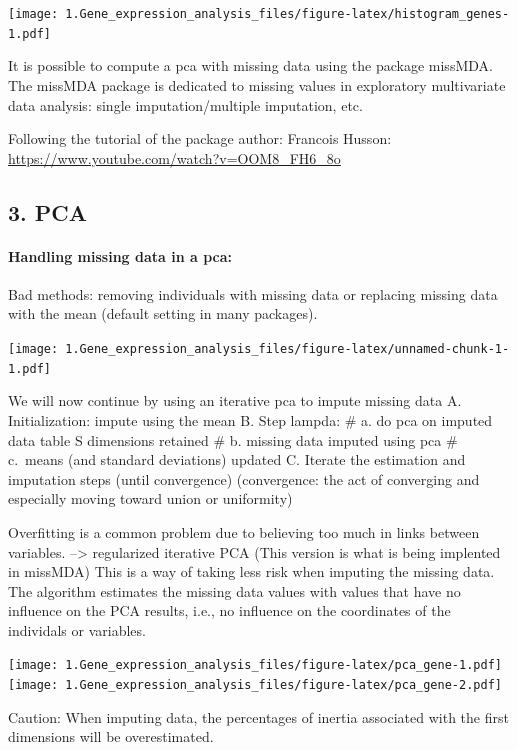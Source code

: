 \documentclass[
]{article}
\begin{document}
\texttt{[image: 1.Gene\_expression\_analysis\_files/figure-latex/histogram\_genes-1.pdf]}

It is possible to compute a pca with missing data using the package
missMDA. The missMDA package is dedicated to missing values in
exploratory multivariate data analysis: single imputation/multiple
imputation, etc.

Following the tutorial of the package author: Francois Husson:
\url{https://www.youtube.com/watch?v=OOM8_FH6_8o}

\hypertarget{pca}{%
\subsection{3. PCA}\label{pca}}

\hypertarget{handling-missing-data-in-a-pca}{%
\paragraph{Handling missing data in a
pca:}\label{handling-missing-data-in-a-pca}}

Bad methods: removing individuals with missing data or replacing missing
data with the mean (default setting in many packages).

\texttt{[image: 1.Gene\_expression\_analysis\_files/figure-latex/unnamed-chunk-1-1.pdf]}

We will now continue by using an iterative pca to impute missing data A.
Initialization: impute using the mean B. Step lampda: \# a. do pca on
imputed data table S dimensions retained \# b. missing data imputed
using pca \# c.~means (and standard deviations) updated C. Iterate the
estimation and imputation steps (until convergence) (convergence: the
act of converging and especially moving toward union or uniformity)

Overfitting is a common problem due to believing too much in links
between variables. --\textgreater{} regularized iterative PCA (This
version is what is being implented in missMDA) This is a way of taking
less risk when imputing the missing data. The algorithm estimates the
missing data values with values that have no influence on the PCA
results, i.e., no influence on the coordinates of the individals or
variables.

\texttt{[image: 1.Gene\_expression\_analysis\_files/figure-latex/pca\_gene-1.pdf]}
\texttt{[image: 1.Gene\_expression\_analysis\_files/figure-latex/pca\_gene-2.pdf]}

Caution: When imputing data, the percentages of inertia associated with
the first dimensions will be overestimated.
\end{document}
